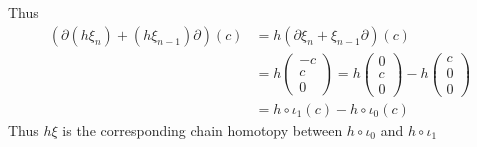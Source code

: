 \documentclass[../main.tex]{subfiles}
\begin{document}
Thus 
\[
\begin{aligned}
\left(\partial(h\xi_n)+(h\xi_{n-1})\partial\right)(c)
&=h(\partial\xi_n+\xi_{n-1}\partial)(c) \\
&=h\begin{pmatrix}
-c \\
c \\
0
\end{pmatrix}
=h\begin{pmatrix}
0 \\
c \\
0
\end{pmatrix}
-h\begin{pmatrix}
c \\
0 \\
0
\end{pmatrix} \\
&=h\circ\iota_1(c)-h\circ\iota_0(c)
\end{aligned}
\]
Thus $h\xi$ is the corresponding chain homotopy between $h\circ\iota_0$ and $h\circ\iota_1$ \par
\end{document}
